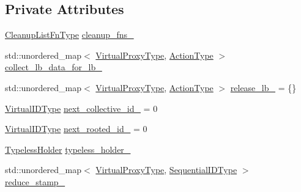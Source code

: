 \subsection*{Private Attributes}
\begin{DoxyCompactItemize}
\item 
\hyperlink{structvt_1_1vrt_1_1collection_1_1_collection_manager_a735e54bc5a8646536d07750e2549a156}{Cleanup\+List\+Fn\+Type} \hyperlink{structvt_1_1vrt_1_1collection_1_1_collection_manager_a5123370561fb8eb70ef7c4979e051706}{cleanup\+\_\+fns\+\_\+}
\item 
std\+::unordered\+\_\+map$<$ \hyperlink{namespacevt_a1b417dd5d684f045bb58a0ede70045ac}{Virtual\+Proxy\+Type}, \hyperlink{namespacevt_ae0a5a7b18cc99d7b732cb4d44f46b0f3}{Action\+Type} $>$ \hyperlink{structvt_1_1vrt_1_1collection_1_1_collection_manager_a74d57793e49293319bf649cfa2c06bcf}{collect\+\_\+lb\+\_\+data\+\_\+for\+\_\+lb\+\_\+}
\item 
std\+::unordered\+\_\+map$<$ \hyperlink{namespacevt_a1b417dd5d684f045bb58a0ede70045ac}{Virtual\+Proxy\+Type}, \hyperlink{namespacevt_ae0a5a7b18cc99d7b732cb4d44f46b0f3}{Action\+Type} $>$ \hyperlink{structvt_1_1vrt_1_1collection_1_1_collection_manager_a42ea6d7733a75f09738a877e90db9aa1}{release\+\_\+lb\+\_\+} = \{\}
\item 
\hyperlink{namespacevt_1_1vrt_a84d0891f52f70728c3fc2172cffb464b}{Virtual\+I\+D\+Type} \hyperlink{structvt_1_1vrt_1_1collection_1_1_collection_manager_ace73d30a3cdd56b3c68c81265bf95020}{next\+\_\+collective\+\_\+id\+\_\+} = 0
\item 
\hyperlink{namespacevt_1_1vrt_a84d0891f52f70728c3fc2172cffb464b}{Virtual\+I\+D\+Type} \hyperlink{structvt_1_1vrt_1_1collection_1_1_collection_manager_a6604b40c9e592d0bf0ff94ccfe156911}{next\+\_\+rooted\+\_\+id\+\_\+} = 0
\item 
\hyperlink{structvt_1_1vrt_1_1collection_1_1_typeless_holder}{Typeless\+Holder} \hyperlink{structvt_1_1vrt_1_1collection_1_1_collection_manager_a25a7c464bb729079cc0a33cbe4bc4f15}{typeless\+\_\+holder\+\_\+}
\item 
std\+::unordered\+\_\+map$<$ \hyperlink{namespacevt_a1b417dd5d684f045bb58a0ede70045ac}{Virtual\+Proxy\+Type}, \hyperlink{namespacevt_a3063d4db3b879d6dd2c7b8d50995c7f6}{Sequential\+I\+D\+Type} $>$ \hyperlink{structvt_1_1vrt_1_1collection_1_1_collection_manager_a482e89c4b14bc1acfab1f23e3dfafbf2}{reduce\+\_\+stamp\+\_\+}
\end{DoxyCompactItemize}
